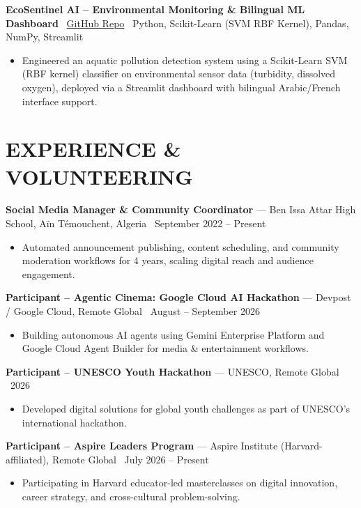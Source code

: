 \documentclass[10pt, letterpaper]{article}
\newcommand{\entry}[4]{%
  \noindent\textbf{#1} --- #3, #4 \textbar\ #2\par
  \vspace{0.5pt}
}
\newcommand{\projectentry}[2]{%
  \noindent\textbf{#1} \textbar\ #2\par
  \vspace{0.5pt}
}
\newcommand{\resumeItem}[1]{\item #1}
\begin{document}
\projectentry{EcoSentinel AI -- Environmental Monitoring \& Bilingual ML Dashboard}{\href{https://github.com/benoualiabdelkader/eco-sentinel-project}{GitHub Repo} \textbar\ Python, Scikit-Learn (SVM RBF Kernel), Pandas, NumPy, Streamlit}
\begin{itemize}
  \resumeItem{Engineered an aquatic pollution detection system using a Scikit-Learn SVM (RBF kernel) classifier on environmental sensor data (turbidity, dissolved oxygen), deployed via a Streamlit dashboard with bilingual Arabic/French interface support.}
\end{itemize}

\section{EXPERIENCE \& VOLUNTEERING}

\entry{Social Media Manager \& Community Coordinator}{September 2022 -- Present}{Ben Issa Attar High School}{Aïn Témouchent, Algeria}
\begin{itemize}
  \resumeItem{Automated announcement publishing, content scheduling, and community moderation workflows for 4 years, scaling digital reach and audience engagement.}
\end{itemize}

\entry{Participant -- Agentic Cinema: Google Cloud AI Hackathon}{August -- September 2026}{Devpost / Google Cloud}{Remote Global}
\begin{itemize}
  \resumeItem{Building autonomous AI agents using Gemini Enterprise Platform and Google Cloud Agent Builder for media \& entertainment workflows.}
\end{itemize}

\entry{Participant -- UNESCO Youth Hackathon}{2026}{UNESCO}{Remote Global}
\begin{itemize}
  \resumeItem{Developed digital solutions for global youth challenges as part of UNESCO's international hackathon.}
\end{itemize}

\entry{Participant -- Aspire Leaders Program}{July 2026 -- Present}{Aspire Institute (Harvard-affiliated)}{Remote Global}
\begin{itemize}
  \resumeItem{Participating in Harvard educator-led masterclasses on digital innovation, career strategy, and cross-cultural problem-solving.}
\end{itemize}
\end{document}

